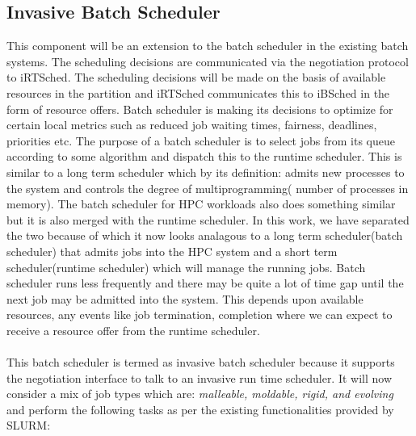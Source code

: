 \subsection{Invasive Batch Scheduler}
This component will be an extension to the batch scheduler in the existing batch systems. The scheduling decisions are communicated via the negotiation protocol to iRTSched. The scheduling decisions will be made on the basis of available resources in the partition and iRTSched communicates this to iBSched in the form of resource offers. Batch scheduler is making its decisions to optimize for certain local metrics such as reduced job waiting times, fairness, deadlines, priorities etc. The purpose of a batch scheduler is to select jobs from its queue according to some algorithm and dispatch this to the runtime scheduler. This is similar to a long term scheduler which by its definition: admits new processes to the system and controls the degree of multiprogramming( number of processes in memory). The batch scheduler for HPC workloads also does something similar but it is also merged with the runtime scheduler. In this work, we have separated the two because of which it now looks analagous to a long term scheduler(batch scheduler) that admits jobs into the HPC system and a short term scheduler(runtime scheduler) which will manage the running jobs. Batch scheduler runs less frequently and there may be quite a lot of time gap until the next job may be admitted into the system. This depends upon available resources, any events like job termination, completion where we can expect to receive a resource offer from the runtime scheduler.\\ \\
This batch scheduler is termed as invasive batch scheduler because it supports the negotiation interface to talk to an invasive run time scheduler. It will now consider a mix of job types which are: \textit{malleable, moldable, rigid, and evolving} and perform the following tasks as per the existing functionalities provided by SLURM:
